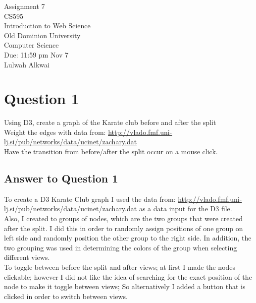 \documentclass[letterpaper,11pt]{article}
\begin{document}
\begin{titlepage}
\begin{center}
\Huge{Assignment 7}
\\
\Large{CS595}
\\
\Large{Introduction to Web Science}
\\
\Large{Old Dominion University}
\\
\Large{Computer Science}
\\
\Large{Due: 11:59 pm Nov 7}
\\
\Large{Lulwah Alkwai}
\\
\end{center}
\end{titlepage}
\newpage

\section*{Question 1}

Using D3, create a graph of the Karate club before and after the split \\

Weight the edges with data from: \url{http://vlado.fmf.uni-lj.si/pub/networks/data/ucinet/zachary.dat} \\

Have the transition from before/after the split occur on a mouse click.  \\
\newpage

\subsection*{Answer to Question 1}
To create a D3 Karate Club graph I used the data from: \url{http://vlado.fmf.uni-lj.si/pub/networks/data/ucinet/zachary.dat} as a data input for the D3 file.\\

Also, I created to groups of nodes, which are the two groups that were created after the split. I did this in order to randomly assign positions of one group on left side and randomly position the other group to the right side. In addition, the two grouping was used in determining the colors of the group when selecting different views.\\

To toggle between before the split and after views; at first I made the nodes clickable; however I did not like the idea of searching for the exact position of the node to make it toggle between views; So alternatively I added a button that is clicked in order to switch between views.\\
\end{document}
